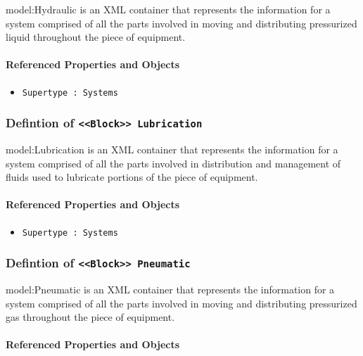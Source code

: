{model:Hydraulic} is an XML container that represents the information for a system comprised of all the parts involved in moving and distributing pressurized liquid throughout the piece of equipment.

\FloatBarrier
\paragraph{Referenced Properties and Objects}

\begin{itemize}
\item \texttt{Supertype : Systems}

\end{itemize}
\FloatBarrier
\subsubsection{Defintion of \texttt{<<Block>> Lubrication}}
  \label{type:Lubrication}

\FloatBarrier

{model:Lubrication} is an XML container that represents the information for a system comprised of all the parts involved in distribution and management of fluids used to lubricate portions of the piece of equipment.

\FloatBarrier
\paragraph{Referenced Properties and Objects}

\begin{itemize}
\item \texttt{Supertype : Systems}

\end{itemize}
\FloatBarrier
\subsubsection{Defintion of \texttt{<<Block>> Pneumatic}}
  \label{type:Pneumatic}

\FloatBarrier

{model:Pneumatic} is an XML container that represents the information for a system comprised of all the parts involved in moving and distributing pressurized gas throughout the piece of equipment.

\FloatBarrier
\paragraph{Referenced Properties and Objects}

